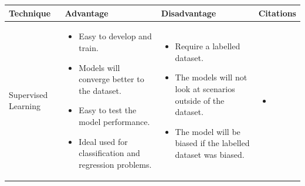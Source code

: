 \begin{longtable}{| p{23mm} | p{44mm} | p{40mm} | p{38mm} |}
\hline
    \textbf{Technique} &
    \textbf{Advantage} &
    \textbf{Disadvantage} &
    \textbf{Citations} \\ \hline
    
    Supervised Learning &
    \vspace{-8mm}
    \begin{itemize}[leftmargin=0mm,noitemsep,nolistsep,label={}] 
        \item Easy to develop and train.
        \item Models will converge better to the dataset.
        \item Easy to test the model performance.
        \item Ideal used for classification and regression problems.
        \vspace{-7mm}
    \end{itemize} &
    \vspace{-8mm}
    \begin{itemize}[leftmargin=0mm,noitemsep,nolistsep,label={}] 
            \item Require a labelled dataset.
            \item The models will not look at scenarios outside of the dataset. 
            \item The model will be biased if the labelled dataset was biased.
            \vspace{-7mm}
    \end{itemize} &
    \vspace{-8mm}
    \begin{itemize}[leftmargin=0mm,noitemsep,nolistsep,label={}] 
        \item \cite{du2018anomaly}
        \vspace{-7mm}
    \end{itemize} \\ \hline
    

\end{longtable}
